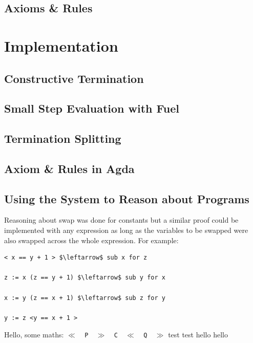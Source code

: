 \documentclass[oneside,12pt]{article}
\begin{document}


\subsection{Axioms \& Rules}

\section{Implementation}

\subsection{Constructive Termination}

\subsection{Small Step Evaluation with Fuel}

\subsection{Termination Splitting}

\subsection{Axiom \& Rules in Agda}

\subsection{Using the System to Reason about Programs}


Reasoning about swap was done for constants but a similar proof could be implemented with any expression as long as the variables to be swapped were also swapped across the whole expression. For example:


\begin{verbatim}
< x == y + 1 > $\leftarrow$ sub x for z
  
z := x (z == y + 1) $\leftarrow$ sub y for x

x := y (z == x + 1) $\leftarrow$ sub z for y

y := z <y == x + 1 >

\end{verbatim}


Hello, some maths: \texttt{$\ll$\!\,\,P\,\,\!$\gg$\!\,\,C\,\,\!$\ll$\!\,\,Q\,\,\!$\gg$} test test hello hello
 
\end{document}
